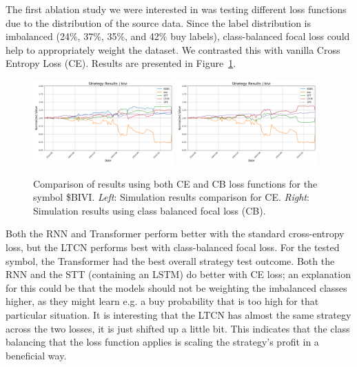 \documentclass[10pt,twocolumn,letterpaper]{article}
\begin{document}
The first ablation study we were interested in was testing different loss functions due to the distribution of the source data. Since the label distribution is imbalanced (24\%, 37\%, 35\%, and 42\% buy labels), class-balanced focal loss could help to appropriately weight the dataset\cite{cb_focal}. We contrasted this with vanilla Cross Entropy Loss (CE). Results are presented in Figure~\ref{fig:ceVsCbLoss}.

\begin{figure}[ht!]
    \centering
    \includegraphics[width=0.48\textwidth]{../figures/simulation_results_all_models_bivi_config_loss_ce.yml.png}
    \includegraphics[width=0.48\textwidth]{../figures/simulation_results_all_models_bivi_config_loss_cbfocal.yml.png} 
    \caption{Comparison of results using both CE and CB loss functions for the symbol \$BIVI. \emph{Left}: Simulation results comparison for CE. \emph{Right}: Simulation results using class balanced focal loss (CB).}
    \label{fig:ceVsCbLoss}
\end{figure}

Both the RNN and Transformer perform better with the standard cross-entropy loss, but the LTCN performs best with class-balanced focal loss. For the tested symbol, the Transformer had the best overall strategy test outcome. Both the RNN and the STT (containing an LSTM) do better with CE loss; an explanation for this could be that the models should not be weighting the imbalanced classes higher, as they might learn e.g. a buy probability that is too high for that particular situation. It is interesting that the LTCN has almost the same strategy across the two losses, it is just shifted up a little bit. This indicates that the class balancing that the loss function applies is scaling the strategy's profit in a beneficial way.
\end{document}
